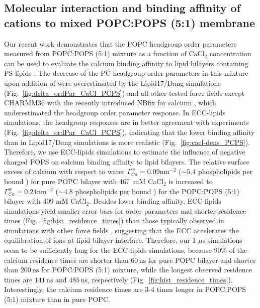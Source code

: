 \documentclass[journal=jpcbfk,manuscript=article]{achemso}
\begin{document}
\subsection{Molecular interaction and binding affinity of  cations to mixed POPC:POPS (5:1) membrane} 
\label{section:lip-ion_ca}
Our recent work demonstrates that the POPC headgroup order parameters measured
from POPC:POPS (5:1) mixture as a function of CaCl$_2$ concentration 
can be used to evaluate the calcium binding affinity to lipid bilayers containing PS lipids \cite{roux90, NMRlipidsIV}.
The decrease of the PC headgroup order parameters in this mixture upon addition of  
were overestimated by the Lipid17/Dang simulations (Fig.~\ref{fig:delta_ordPar_CaCl_PCPS})
and all other tested force fields except CHARMM36 with the recently introduced NBfix for calcium \cite{kim16},
which underestimated the headgroup order parameter response.
In ECC-lipids simulations, the headgroup responses are in better agreement with experiments (Fig.~\ref{fig:delta_ordPar_CaCl_PCPS}),
indicating that the lower binding affinity than in Lipid17/Dang simulations is more realistic (Fig.~\ref{fig:cacl-dens_PCPS}).
Therefore, we use ECC-lipids simulations to estimate the influence of negative charged POPS on
calcium binding affinity to lipid bilayers.
The relative surface excess of calcium with respect to water 
$\Gamma^{w}_{Ca} = 0.09\mathrm{nm^{-2}}$ ($\sim 5.4$ phospholipids per bound ) for pure POPC bilayer with 467~mM CaCl$_2$ \cite{ECC-POPC_nacl_cacl2_files}
is increased to
$\Gamma^{w}_{Ca} = 0.24\mathrm{nm^{-2}}$ ($\sim 4.8$ phospholipids per bound ) for the POPC:POPS (5:1) bilayer with 409 mM CaCl$_2$.
Besides lower binding affinity, ECC-lipids simulations yield smaller error bars for order parameters and shorter residence times (Fig.~\ref{fig:hist_residence_times}) 
than those typically observed in simulations with other force fields \cite{javanainen17,melcr18,NMRlipidsIV},
suggesting that the ECC accelerates the equilibration of ions at lipid bilayer interface.
Therefore, our 1 $\mu$s simulations seem to be sufficiently long for the ECC-lipids simulations, because
90\% of the calcium residence times are shorter than $60\,\mathrm{ns}$ for pure POPC bilayer
and shorter than $200\,\mathrm{ns}$ for POPC:POPS (5:1) mixture, while the
longest observed residence times are $141\,\mathrm{ns}$ and $485\,\mathrm{ns}$, respectively (Fig.~\ref{fig:hist_residence_times}).
Interestingly, the calcium residence times are 3-4 times longer in POPC:POPS (5:1) mixture than in pure POPC.
\end{document}
